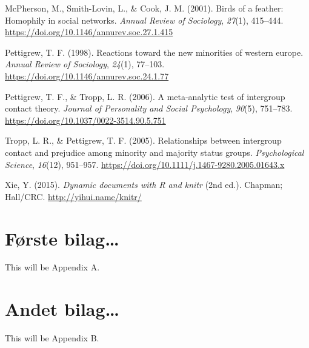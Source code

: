 \documentclass[
]{book}
\newlength{\cslhangindent}
\newlength{\cslentryspacingunit} %
\newenvironment{CSLReferences}[2] %
 {%
  \setlength{\parindent}{0pt}
  \ifodd #1
  \let\oldpar\par
  \def\par{\hangindent=\cslhangindent\oldpar}
  \fi
  \setlength{\parskip}{#2\cslentryspacingunit}
 }%
 {}
\begin{document}
\begin{CSLReferences}{1}{0}
\leavevmode{}%
McPherson, M., Smith-Lovin, L., \& Cook, J. M. (2001). Birds of a feather: Homophily in social networks. \emph{Annual Review of Sociology}, \emph{27}(1), 415--444. \url{https://doi.org/10.1146/annurev.soc.27.1.415}

\leavevmode{}%
Pettigrew, T. F. (1998). Reactions toward the new minorities of western europe. \emph{Annual Review of Sociology}, \emph{24}(1), 77--103. \url{https://doi.org/10.1146/annurev.soc.24.1.77}

\leavevmode{}%
Pettigrew, T. F., \& Tropp, L. R. (2006). A meta-analytic test of intergroup contact theory. \emph{Journal of Personality and Social Psychology}, \emph{90}(5), 751--783. \url{https://doi.org/10.1037/0022-3514.90.5.751}

\leavevmode{}%
Tropp, L. R., \& Pettigrew, T. F. (2005). Relationships between intergroup contact and prejudice among minority and majority status groups. \emph{Psychological Science}, \emph{16}(12), 951--957. \url{https://doi.org/10.1111/j.1467-9280.2005.01643.x}

\leavevmode{}%
Xie, Y. (2015). \emph{Dynamic documents with {R} and knitr} (2nd ed.). Chapman; Hall/CRC. \url{http://yihui.name/knitr/}

\end{CSLReferences}

\hypertarget{appendix-bilag}{%
\appendix}


\hypertarget{bilag1}{%
\chapter{Første bilag\ldots{}}\label{bilag1}}

This will be Appendix A.

\hypertarget{bilag2}{%
\chapter{Andet bilag\ldots{}}\label{bilag2}}

This will be Appendix B.
\end{document}
